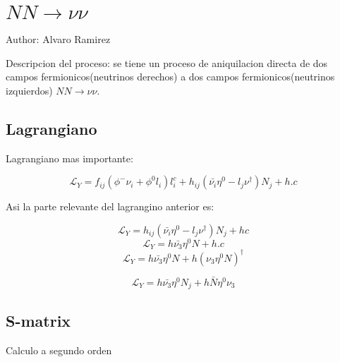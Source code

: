 \chapter{$NN\to \nu\nu$}

Author: Alvaro Ramirez

Descripcion del proceso: se tiene un proceso de aniquilacion directa de dos campos fermionicos(neutrinos derechos) a dos campos fermionicos(neutrinos izquierdos) $NN\to \nu\nu$.

\section{Lagrangiano}

Lagrangiano mas importante:

\begin {equation}
	\mathcal{L}_{Y}=f_{ij}({\phi}^{-}{\nu}_{i}+{\phi}^{0}{l}_{i}){l}_{i}^c+{h}_{ij}(\bar{{\nu}_{i}}{\eta}^0-{l}_{j}{\nu}^{\dagger}){N}_{j}+h.c
\end{equation}

Asi la parte relevante del lagrangino anterior es:

\begin {equation}
\mathcal{L}_{Y}={h}_{ij}(\bar{{\nu}_{i}}{\eta}^0-{l}_{j}{\nu}^{\dagger}){N}_{j}+hc
\end{equation}
\begin {equation}
\mathcal{L}_{Y}=h\bar{{\nu}_{3}}{\eta}^0{N}+h.c
\end{equation}
\begin {equation}
\mathcal{L}_{Y}=h\bar{{\nu}_{3}}{\eta}^0{N}+h(\nu_{3}{\eta}^{0}N)^{\dagger}
\end{equation}

\begin {equation}
\mathcal{L}_{Y}=h\bar{{\nu}_{3}}{\eta}^0{N}_{j}+h\bar{N}\eta^{0}\nu_{3}
\end{equation}


\section{S-matrix}

Calculo a segundo orden

